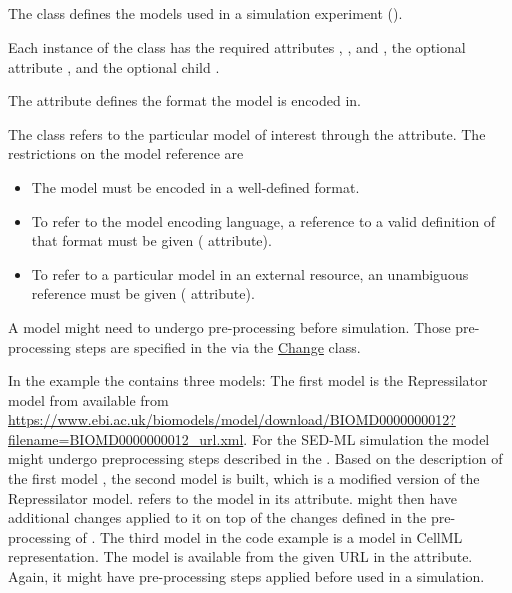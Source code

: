\subsection{}
\label{class:model}
The  class defines the models used in a simulation experiment ().


Each instance of the  class has the required attributes \hyperref[sec:id]{}, \hyperref[sec:model_source]{}, and \hyperref[sec:language]{}, the optional attribute \hyperref[sec:name]{}, and the optional child \hyperref[sec:changesModel]{}.

The \hyperref[sec:language]{} attribute defines the format the model is encoded in.

The  class refers to the particular model of interest through the \hyperref[sec:model_source]{} attribute. The restrictions on the model reference are
\begin{itemize}
 \item{The model must be encoded in a well-defined format.}
 \item{To refer to the model encoding language, a reference to a valid definition of that format must be given (\hyperref[sec:language]{} attribute).}
 \item{To refer to a particular model in an external resource, an unambiguous reference must be given (\hyperref[sec:model_source]{} attribute).}
\end{itemize}

A model might need to undergo pre-processing before simulation. Those pre-processing steps are specified in the \hyperref[sec:changesModel]{} via the \hyperref[class:change]{Change} class.


In the example the \hyperref[class:listOfModels]{} contains three models: The first model  is the Repressilator model from \biom available from \url{https://www.ebi.ac.uk/biomodels/model/download/BIOMD0000000012?filename=BIOMD0000000012_url.xml}. For the SED-ML simulation the model might undergo preprocessing steps described in the \hyperref[sec:changesModel]{}. Based on the description of the first model , the second model  is built, which is a modified version of the Repressilator model.  refers to the model  in its \hyperref[sec:model_source]{} attribute.  might then have additional changes applied to it on top of the changes defined in the pre-processing of . The third model in the code example is a model in CellML representation. The model  is available from the given URL in the \hyperref[sec:model_source]{} attribute. Again, it might have pre-processing steps applied before used in a simulation.


